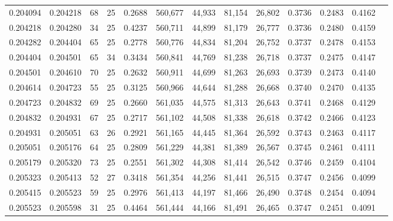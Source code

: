 \begin{tabular}{rrrrrrrrrrrrr}
0.204094 & 0.204218 &    68 &  25 &                                     0.2688 & 560,677 &  44,933 &  81,154 &  26,802 & 0.3736 & 0.2483 & 0.4162 \\
0.204218 & 0.204280 &    34 &  25 &                                     0.4237 & 560,711 &  44,899 &  81,179 &  26,777 & 0.3736 & 0.2480 & 0.4159 \\
0.204282 & 0.204404 &    65 &  25 &                                     0.2778 & 560,776 &  44,834 &  81,204 &  26,752 & 0.3737 & 0.2478 & 0.4153 \\
0.204404 & 0.204501 &    65 &  34 &                                     0.3434 & 560,841 &  44,769 &  81,238 &  26,718 & 0.3737 & 0.2475 & 0.4147 \\
0.204501 & 0.204610 &    70 &  25 &                                     0.2632 & 560,911 &  44,699 &  81,263 &  26,693 & 0.3739 & 0.2473 & 0.4140 \\
0.204614 & 0.204723 &    55 &  25 &                                     0.3125 & 560,966 &  44,644 &  81,288 &  26,668 & 0.3740 & 0.2470 & 0.4135 \\
0.204723 & 0.204832 &    69 &  25 &                                     0.2660 & 561,035 &  44,575 &  81,313 &  26,643 & 0.3741 & 0.2468 & 0.4129 \\
0.204832 & 0.204931 &    67 &  25 &                                     0.2717 & 561,102 &  44,508 &  81,338 &  26,618 & 0.3742 & 0.2466 & 0.4123 \\
0.204931 & 0.205051 &    63 &  26 &                                     0.2921 & 561,165 &  44,445 &  81,364 &  26,592 & 0.3743 & 0.2463 & 0.4117 \\
0.205051 & 0.205176 &    64 &  25 &                                     0.2809 & 561,229 &  44,381 &  81,389 &  26,567 & 0.3745 & 0.2461 & 0.4111 \\
0.205179 & 0.205320 &    73 &  25 &                                     0.2551 & 561,302 &  44,308 &  81,414 &  26,542 & 0.3746 & 0.2459 & 0.4104 \\
0.205323 & 0.205413 &    52 &  27 &                                     0.3418 & 561,354 &  44,256 &  81,441 &  26,515 & 0.3747 & 0.2456 & 0.4099 \\
0.205415 & 0.205523 &    59 &  25 &                                     0.2976 & 561,413 &  44,197 &  81,466 &  26,490 & 0.3748 & 0.2454 & 0.4094 \\
0.205523 & 0.205598 &    31 &  25 &                                     0.4464 & 561,444 &  44,166 &  81,491 &  26,465 & 0.3747 & 0.2451 & 0.4091 \\

\end{tabular}

